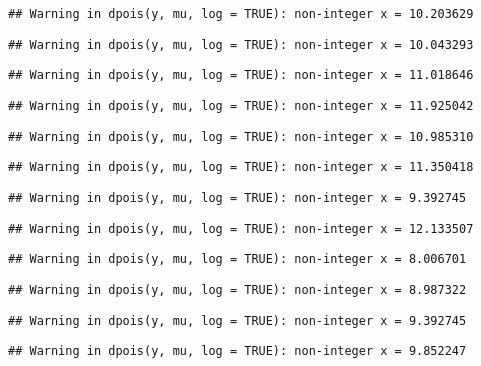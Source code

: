 \documentclass[
]{article}
\begin{document}
\begin{verbatim}
## Warning in dpois(y, mu, log = TRUE): non-integer x = 10.203629
\end{verbatim}

\begin{verbatim}
## Warning in dpois(y, mu, log = TRUE): non-integer x = 10.043293
\end{verbatim}

\begin{verbatim}
## Warning in dpois(y, mu, log = TRUE): non-integer x = 11.018646
\end{verbatim}

\begin{verbatim}
## Warning in dpois(y, mu, log = TRUE): non-integer x = 11.925042
\end{verbatim}

\begin{verbatim}
## Warning in dpois(y, mu, log = TRUE): non-integer x = 10.985310
\end{verbatim}

\begin{verbatim}
## Warning in dpois(y, mu, log = TRUE): non-integer x = 11.350418
\end{verbatim}

\begin{verbatim}
## Warning in dpois(y, mu, log = TRUE): non-integer x = 9.392745
\end{verbatim}

\begin{verbatim}
## Warning in dpois(y, mu, log = TRUE): non-integer x = 12.133507
\end{verbatim}

\begin{verbatim}
## Warning in dpois(y, mu, log = TRUE): non-integer x = 8.006701
\end{verbatim}

\begin{verbatim}
## Warning in dpois(y, mu, log = TRUE): non-integer x = 8.987322
\end{verbatim}

\begin{verbatim}
## Warning in dpois(y, mu, log = TRUE): non-integer x = 9.392745
\end{verbatim}

\begin{verbatim}
## Warning in dpois(y, mu, log = TRUE): non-integer x = 9.852247
\end{verbatim}
\end{document}

